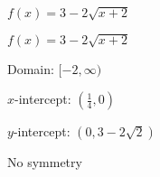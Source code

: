 {$f(x) = 3-2\sqrt{x+2}$}
{$f(x) = 3-2\sqrt{x+2}$ 

Domain: $[-2,\infty)$ 

$x$-intercept: $\left(\frac{1}{4}, 0\right)$ 

$y$-intercept: $(0, 3-2\sqrt{2})$ 

No symmetry 

\begin{center}
\end{center}
}
